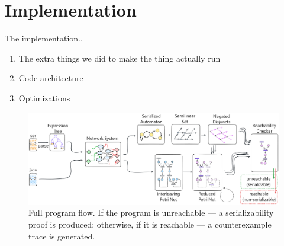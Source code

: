 

\section{Implementation}
\label{sec:implementation}

The implementation..

\begin{enumerate}
	\item The extra things we did to make the thing actually run
	\item Code architecture
	\item Optimizations
\end{enumerate}


\begin{figure}[htbp]
	\centering
	\includegraphics[width=1.0\textwidth]{plots/full_program_flow.pdf}
	\caption{Full program flow. If the program is unreachable --- a serializability proof is produced; otherwise, if it is reachable --- a counterexample trace is generated.}
	\label{fig:full_program_flow}
\end{figure}




